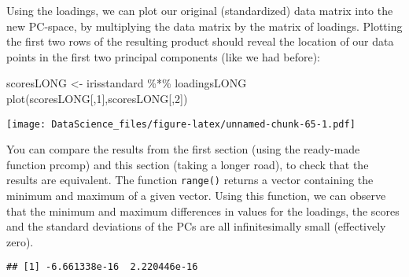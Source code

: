 \documentclass[
]{book}
\newenvironment{Shaded}{\begin{snugshade}}{\end{snugshade}}
\newcommand{\DecValTok}[1]{\textcolor[rgb]{0.00,0.00,0.81}{#1}}
\newcommand{\FunctionTok}[1]{\textcolor[rgb]{0.00,0.00,0.00}{#1}}
\newcommand{\NormalTok}[1]{#1}
\newcommand{\OtherTok}[1]{\textcolor[rgb]{0.56,0.35,0.01}{#1}}
\newcommand{\SpecialCharTok}[1]{\textcolor[rgb]{0.00,0.00,0.00}{#1}}
\begin{document}
\begin{Shaded}
\end{Shaded}

Using the loadings, we can plot our original (standardized) data matrix into the new PC-space, by multiplying the data matrix by the matrix of loadings. Plotting the first two rows of the resulting product should reveal the location of our data points in the first two principal components (like we had before):

\begin{Shaded}
\begin{Highlighting}[]
\NormalTok{scoresLONG }\OtherTok{\textless{}{-}}\NormalTok{ irisstandard }\SpecialCharTok{\%*\%}\NormalTok{ loadingsLONG}
\FunctionTok{plot}\NormalTok{(scoresLONG[,}\DecValTok{1}\NormalTok{],scoresLONG[,}\DecValTok{2}\NormalTok{])}
\end{Highlighting}
\end{Shaded}

\texttt{[image: DataScience\_files/figure-latex/unnamed-chunk-65-1.pdf]}

You can compare the results from the first section (using the ready-made function prcomp) and this section (taking a longer road), to check that the results are equivalent. The function \texttt{range()} returns a vector containing the minimum and maximum of a given vector. Using this function, we can observe that the minimum and maximum differences in values for the loadings, the scores and the standard deviations of the PCs are all infinitesimally small (effectively zero).

\begin{Shaded}
\end{Shaded}

\begin{verbatim}
## [1] -6.661338e-16  2.220446e-16
\end{verbatim}
\end{document}
